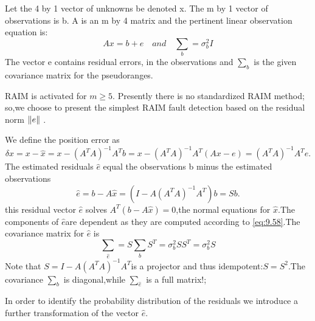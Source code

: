 		Let the 4 by 1 vector of unknowns be denoted x. The m by 1 vector of observations is b. A is an m by 4 matrix and the pertinent linear observation equation is:
		\begin{equation}\label{eq:9.56}
			Ax = b + e\quad and\quad \sum_b = \sigma^2_bI
		\end{equation}
		The vector e contains residual errors, in the observations and $\sum_b$ is the given covariance matrix for the pseudoranges.
		
		RAIM is activated for $m\geq5$. Presently there is no standardized RAIM method; so,we choose to present the simplest RAIM fault detection based on the residual norm $\Arrowvert e \Arrowvert$ .
		
		We define the position error as
		\begin{equation}\label{eq:9.57}
			\delta x = x - \hat{x} = x - (A^TA)^{-1}A^Tb = x-(A^TA)^{-1}A^T(Ax-e) = (A^TA)^{-1}A^Te.
		\end{equation}
		The estimated residuals $\hat{e}$ equal the observations b minus the estimated observations
		\begin{equation}\label{eq:9.58}
			\hat{e} = b-A\hat{x} = (I-A(A^TA)^{-1}A^T)b = Sb.
		\end{equation}
		this residual vector $\hat{e}$ solves $A^T(b-A\hat{x})=0$,the normal equations for $\hat{x}$.The components of $\hat{e}$are dependent as they are computed according to \ref{eq:9.58}.The covariance matrix for $\hat{e}$ is
		\begin{equation}\label{eq:9.59}
			\sum_{\hat{e}} = S \sum_{b}S^T= \sigma^2_bSS^T=\sigma^2_bS
		\end{equation}
		Note that $S=I-A(A^TA)^{-1}A^T$is a projector and thus idempotent:$S=S^2$.The covariance $\sum_b$ is diagonal,while $\sum_{\hat{e}}$ is a full matrix!;
		
		In order to identify the probability distribution of the residuals we introduce a further transformation of the vector $\hat{e}$.
		
